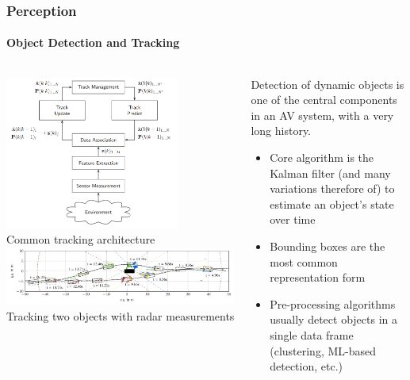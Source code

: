 {\begin{frame}
\frametitle{Perception}
\framesubtitle{Object Detection and Tracking}
\begin{columns}[T]
    \begin{column}{.45\textwidth}
        \centering
        \includegraphics[width=0.75\textwidth]{images/aeberhard_tracking.png}\\
        \tiny{Common tracking architecture \cite{AeberhardDissertation}}\\
        \vspace{0.25cm}
        \includegraphics[width=\textwidth]{images/scheel_radar_tracking.png}\\
        \tiny{Tracking two objects with radar measurements \cite{Scheel2019}}
    \end{column}
    \begin{column}{.55\textwidth}
        Detection of dynamic objects is one of the central components in an
        AV system, with a very long history.
        \begin{itemize}
            \item Core algorithm is the Kalman filter \cite{Kalman1960}
                (and many variations therefore of) to estimate an object's
                state over time
            \item Bounding boxes are the most common representation form
            \item Pre-processing algorithms usually detect objects in a single
                data frame (clustering, ML-based detection, etc.)
        \end{itemize}
    \end{column}
\end{columns}
\end{frame}

}
